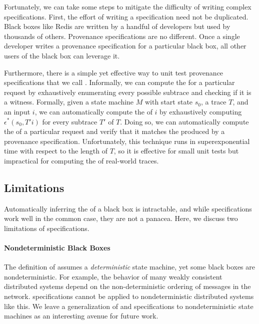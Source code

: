 Fortunately, we can take some steps to mitigate the difficulty of writing
complex \watprovenance{} specifications.  First, the effort of writing a
\watprovenance{} specification need not be duplicated. Black boxes like Redis
are written by a handful of developers but used by thousands of others.
Provenance specifications are no different. Once a single developer writes a
provenance specification for a particular black box, all other users of the
black box can leverage it.

Furthermore, there is a simple yet effective way to unit test provenance
specifications that we call .
Informally, we can compute the \watprovenance{} for a particular request by
exhaustively enumerating every possible subtrace and checking if it is a
witness. Formally, given a state machine $M$ with start state $s_0$, a trace
$T$, and an input $i$, we can automatically compute the \watprovenance{} of $i$
by exhaustively computing $\epsilon^*(s_0, T'i)$ for every subtrace $T'$ of
$T$. Doing so, we can automatically compute the \watprovenance{} of a
particular request and verify that it matches the \watprovenance{} produced by
a provenance specification. Unfortunately, this technique runs in
superexponential time with respect to the length of $T$, so it is effective for
small unit tests but impractical for computing the \watprovenance{} of
real-world traces.

\subsection{Limitations}
Automatically inferring the \watprovenance{} of a black box is intractable, and
while \watprovenance{} specifications work well in the common case, they are
not a panacea. Here, we discuss two limitations of \watprovenance{}
specifications.

\paragraph{Nondeterministic Black Boxes}
The definition of \watprovenance{} assumes a \emph{deterministic} state
machine, yet some black boxes are nondeterministic. For example, the behavior
of many weakly consistent distributed systems depend on the non-deterministic
ordering of messages in the network. \Watprovenance{} specifications cannot be
applied to nondeterministic distributed systems like this. We leave a
generalization of \watprovenance{} and \watprovenance{} specifications to
nondeterministic state machines as an interesting avenue for future work.

